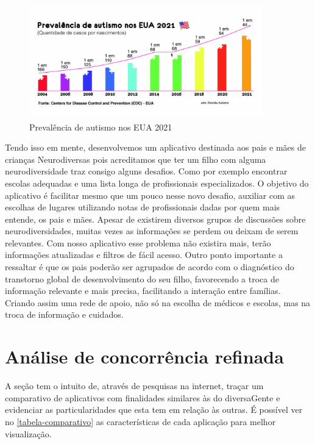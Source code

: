 \begin{figure}[htb]
	
	\centering
	\caption{\label{fig_arq_virado}Prevalência de autismo nos EUA 2021}
	\includegraphics[width=0.9\textwidth]{anexos/diversaGenteGrafico.png}

\end{figure}

Tendo isso em mente, desenvolvemos um aplicativo destinada aos pais e mães de crianças Neurodiversas  pois acreditamos que ter um filho com alguma neurodiversidade traz consigo alguns desafios. Como por exemplo encontrar escolas adequadas e uma lista longa de profissionais especializados. O objetivo do aplicativo é facilitar mesmo que um pouco nesse novo desafio, auxiliar com as escolhas de lugares utilizando notas de profissionais dadas por quem mais entende, os pais e mães. 
Apesar de existirem diversos grupos de discussões sobre neurodiversidades, muitas vezes as informações se perdem ou deixam de serem relevantes. Com nosso aplicativo esse problema não existira mais, terão informações atualizadas e filtros de fácil acesso. Outro ponto importante a ressaltar é que os pais poderão ser agrupados de acordo com o diagnóstico do transtorno global de desenvolvimento do seu filho, favorecendo a troca de informação relevante e mais precisa, facilitando a interação entre famílias. Criando assim uma rede de apoio, não só na escolha de médicos e escolas, mas na troca de informação e cuidados.


\section{Análise de concorrência refinada}

A seção tem o intuito de, através de pesquisas na internet, traçar um comparativo de aplicativos com finalidades similares às do diversaGente e evidenciar as particularidades que esta tem em relação às outras. É possível ver no \autoref{tabela-comparativo} as características de cada aplicação para melhor visualização. 

